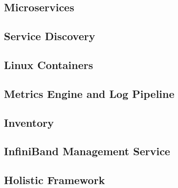 \subsection{Microservices}



\subsection{Service Discovery}


\subsection{Linux Containers}


\subsection{Metrics Engine and Log Pipeline}




\subsection{Inventory}


\subsection{InfiniBand Management Service}


\subsection{Holistic Framework}

